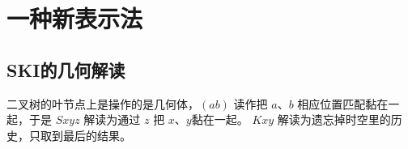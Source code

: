 \documentclass[a4paper,12pt]{article}
\numberwithin{definition}{section}
\numberwithin{lemma}{section}
\numberwithin{proposition}{section}
\numberwithin{theorem}{section}
\numberwithin{grammar}{section}
\numberwithin{program}{section}
\numberwithin{convention}{section}
\numberwithin{corollary}{section}
\begin{document}
\newpage

\section{一种新表示法}

\subsection{SKI的几何解读}

二叉树的叶节点上是操作的是几何体，$(a b)$ 读作把 $a$、$b$ 相应位置匹配黏在一起，于是 $Sxyz$ 解读为通过 $z$ 把 $x$、$y$黏在一起。
$Kxy$ 解读为遗忘掉时空里的历史，只取到最后的结果。
\end{document}
